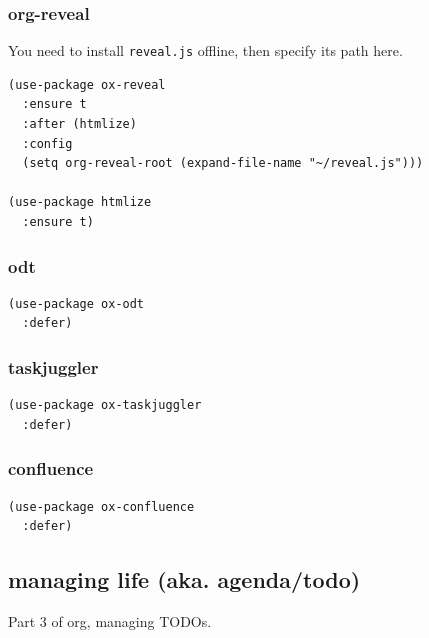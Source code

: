 \documentclass[11pt]{article}
\begin{document}
\subsubsection{org-reveal}
\label{sec:org6c6b05c}

You need to install \texttt{reveal.js} offline, then specify its path here.
\begin{verbatim}
(use-package ox-reveal
  :ensure t
  :after (htmlize)
  :config
  (setq org-reveal-root (expand-file-name "~/reveal.js")))

(use-package htmlize
  :ensure t)
\end{verbatim}
\subsubsection{odt}
\label{sec:org2bb1150}
\begin{verbatim}
(use-package ox-odt
  :defer)
\end{verbatim}
\subsubsection{taskjuggler}
\label{sec:org0c2cf98}
\begin{verbatim}
(use-package ox-taskjuggler
  :defer)
\end{verbatim}
\subsubsection{confluence}
\label{sec:org5c9bab8}
\begin{verbatim}
(use-package ox-confluence
  :defer)
\end{verbatim}

\subsection{managing life (aka. agenda/todo)}
\label{sec:org43dfb07}

Part 3 of org, managing TODOs.
\end{document}
